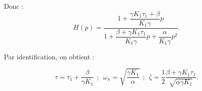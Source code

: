 \begin{multicols}{2}
\begin{corrige}
Donc :
$$\boxed{H(p)=\dfrac{1+ \dfrac{\gamma K_1\tau_1+\beta}{K_1\gamma }p}{1 + \dfrac{\beta +\gamma K_1\tau_1}{K_1\gamma}p+ \dfrac{\alpha}{K_1\gamma} p^2}.}$$


Par identification, on obtient :

$$\tau=\tau_1+\dfrac{\beta}{\gamma K_1} \ \ ; \ \ \omega_n=\sqrt{\frac{\gamma K_1}{\alpha}} \ \ ; \ \ \zeta=\dfrac{1}{2}\dfrac{\beta+\gamma K_1 \tau_1}{\sqrt{\alpha \gamma K_1}}.$$


\end{corrige}
\else
\fi

\ifprof
\else
%
%
%
%
%
%
%
%
%


\end{multicols}
